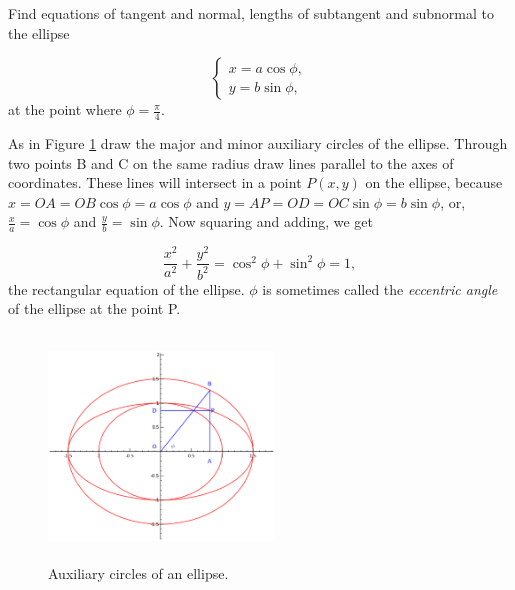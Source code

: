 \begin{example}
{\rm
Find equations of tangent and normal, lengths of subtangent 
and subnormal to the ellipse

\begin{equation}
\begin{cases} 
x = a \cos \phi, \\ 
y = b \sin \phi, 
\end{cases}
\label{eqn:E-66}
\end{equation}	
at the point where $\phi = \frac{\pi}{4}$.

As in Figure \ref{fig:ellipse} draw the major and minor auxiliary circles 
of the ellipse. Through two points B and C on the same 
radius draw lines parallel to the axes of coordinates. 
These lines will intersect in a point $P(x,y)$ on the ellipse, because
$x = OA = OB\cos\phi = a\cos\phi$
and $y = AP = OD = OC\sin\phi = b\sin\phi$,
or, $\frac{x}{a} = \cos \phi$ and 
$\frac{y}{b} = \sin \phi$.
Now squaring and adding, we get

\[
   \frac{x^2}{a^2} + \frac{y^2}{b^2} = \cos^2 \phi + \sin^2 \phi = 1,
\]
the rectangular equation of the ellipse. 
$\phi$ is sometimes called 
the {\it eccentric angle} of the ellipse at the point P.

\begin{figure}[h!]
\begin{minipage}{\textwidth}
\begin{center}
\includegraphics[height=6cm,width=6cm]{ellipse2.eps}
\end{center}
\end{minipage}
\caption{Auxiliary circles of an ellipse.}
\label{fig:ellipse}
\end{figure}


}
\end{example}
